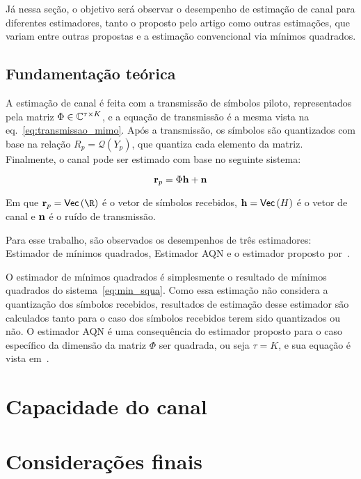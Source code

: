 \documentclass{article}
\begin{document}
Já nessa seção, o objetivo será observar o desempenho de estimação de canal para diferentes estimadores, tanto o proposto pelo artigo como outras estimações, que variam entre outras propostas e a estimação convencional via mínimos quadrados. 

\subsection{Fundamentação teórica}

A estimação de canal é feita com a transmissão de símbolos piloto, representados pela matriz $\Phi\in\mathbb{C}^{\tau\times K}$, e a equação de transmissão é a mesma vista na eq.~\eqref{eq:transmissao_mimo}. Após a transmissão, os símbolos são quantizados com base na relação $R_p=\mathcal{Q}(Y_p)$, que quantiza cada elemento da matriz. Finalmente, o canal pode ser estimado com base no seguinte sistema:

\begin{equation}
    \label{eq:min_squa}
    \mathbf{r}_p = \Phi\mathbf{h} + \mathbf{n}
\end{equation}

Em que $\rbf_p=\Vect{\R}$ é o vetor de símbolos recebidos, $\mathbf{h}= \mathsf{Vec} \left( H \right) $ é o vetor de canal e $\mathbf{n}$ é o ruído de transmissão. 

Para esse trabalho, são observados os desempenhos de três estimadores: Estimador de mínimos quadrados, Estimador AQN e o estimador proposto por~\cite{li.etal_2017a}. 

O estimador de mínimos quadrados é simplesmente o resultado de mínimos quadrados do sistema~\eqref{eq:min_squa}. Como essa estimação não considera a quantização dos símbolos recebidos, resultados de estimação desse estimador são calculados tanto para o caso dos símbolos recebidos terem sido quantizados ou não. O estimador AQN é uma consequência do estimador proposto para o caso específico da dimensão da matriz $\Phi$ ser quadrada, ou seja $\tau=K$, e sua equação é vista em~\cite[eq. 16]{li.etal_2017a}. 



\section{Capacidade do canal}
\label{sec:capacidade_canal}


\section{Considerações finais}
\label{sec:consideracoes_finais}

\printbibliography
\end{document}
